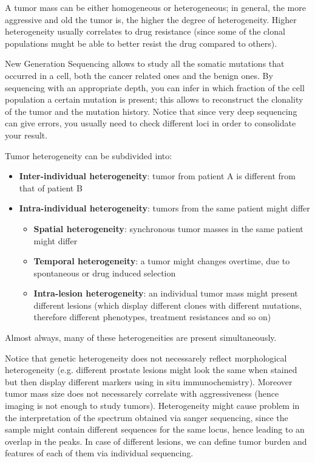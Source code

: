   A tumor mass can be either homogeneous or heterogeneous; in general, the more aggressive and old the tumor is, the higher the degree of heterogeneity. Higher heterogeneity usually correlates to drug resistance (since some of the clonal populations mught be able to better resist the drug compared to others).

  New Generation Sequencing allows to study all the somatic mutations that occurred in a cell, both the cancer related ones and the benign ones. By sequencing with an appropriate depth, you can infer in which fraction of the cell population a certain mutation is present; this allows to reconstruct the clonality of the tumor and the mutation history. Notice that since very deep sequencing can give errors, you usually need to check different loci in order to consolidate your result. 

  Tumor heterogeneity can be subdivided into: 
  \begin{itemize}
    \item \textbf{Inter-individual heterogeneity}: tumor from patient A is different from that of patient B
    \item \textbf{Intra-individual heterogeneity}: tumors from the same patient might differ
    \begin{itemize}
      \item \textbf{Spatial heterogeneity}: synchronous tumor masses in the same patient might differ 
      \item \textbf{Temporal heterogeneity}: a tumor might changes overtime, due to spontaneous or drug induced selection
      \item \textbf{Intra-lesion heterogeneity}: an individual tumor mass might present different lesions (which display different clones with different mutations, therefore different phenotypes, treatment resistances and so on)
    \end{itemize}
  \end{itemize}
  Almost always, many of these heterogeneities are present simultaneously. 
  
  Notice that genetic heterogeneity does not necessarely reflect morphological heterogeneity (e.g. different prostate lesions might look the same when stained but then display different markers using in situ immunochemistry). Moreover tumor mass size does not necessarely correlate with aggressiveness (hence imaging is not enough to study tumors).
  Heterogeneity might cause problem in the interpretation of the spectrum obtained via sanger sequencing, since the sample might contain different sequences for the same locus, hence leading to an overlap in the peaks. 
  In case of different lesions, we can define tumor burden and features of each of them via individual sequencing.

